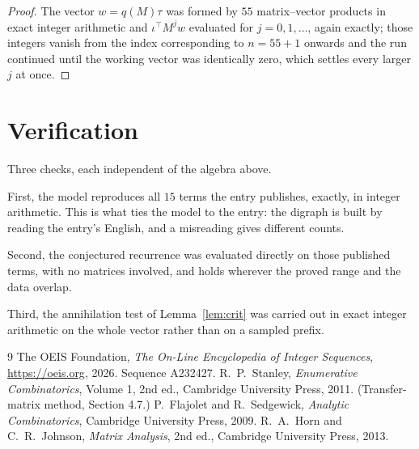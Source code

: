 \documentclass[11pt,a4paper]{article}
\theoremstyle{plain}
\theoremstyle{definition}
\begin{document}
\begin{proof}
The vector $w=q(M)\tau$ was formed by $55$ matrix--vector products in exact integer
arithmetic and $\iota^{\!\top}M^{j}w$ evaluated for $j=0,1,\dots$, again exactly; those
integers vanish from the index corresponding to $n=55+1$ onwards and the run continued
until the working vector was identically zero, which settles every larger $j$ at once.
\end{proof}

\section{Verification}

Three checks, each independent of the algebra above.

First, the model reproduces all $15$ terms the entry publishes, exactly, in integer
arithmetic. This is what ties the model to the entry: the digraph is built by reading the
entry's English, and a misreading gives different counts.

Second, the conjectured recurrence was evaluated directly on those published terms, with no
matrices involved, and holds wherever the proved range and the data overlap.

Third, the annihilation test of Lemma~\ref{lem:crit} was carried out in exact integer
arithmetic on the whole vector rather than on a sampled prefix.

\begin{thebibliography}{9}
 The OEIS Foundation, \emph{The On-Line Encyclopedia of Integer
Sequences}, \url{https://oeis.org}, 2026. Sequence A232427.
 R.~P.~Stanley, \emph{Enumerative Combinatorics}, Volume 1, 2nd ed.,
Cambridge University Press, 2011. (Transfer-matrix method, Section 4.7.)
 P.~Flajolet and R.~Sedgewick, \emph{Analytic Combinatorics}, Cambridge
University Press, 2009.
 R.~A.~Horn and C.~R.~Johnson, \emph{Matrix Analysis}, 2nd ed., Cambridge
University Press, 2013.
\end{thebibliography}
\end{document}
